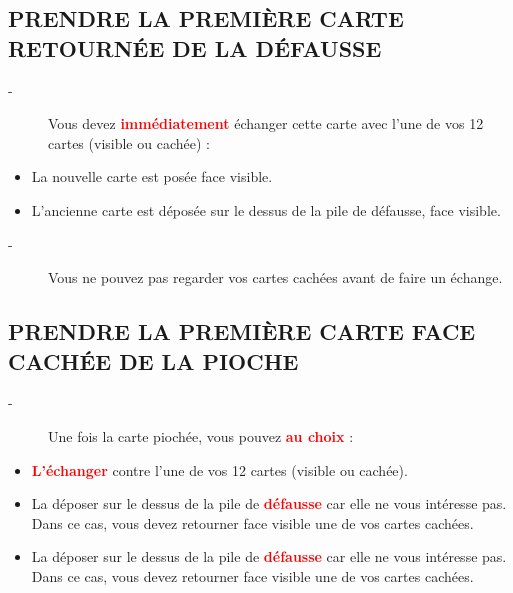 \documentclass{article}%
\begin{document}
%
\subsection{ PRENDRE LA PREMIÈRE CARTE RETOURNÉE DE LA DÉFAUSSE
}%
\label{subsec:PRENDRELAPREMIRECARTERETOURNEDELADFAUSSE}%
\begin{description}%
\item[{-} ]%
%
 Vous devez %
\textcolor{red}{%
\textbf{immédiatement}%
}%
\textit{ }%
 échanger cette carte avec l’une de vos 12 cartes (visible ou cachée) :
%
\end{description}%
\begin{itemize}%
\item%
%
 La nouvelle carte est posée face visible.
%
\item%
%
 L'ancienne carte est déposée sur le dessus de la pile de défausse, face visible.
%
\end{itemize}%
\begin{description}%
\item[{-} ]%
%
 Vous ne pouvez pas regarder vos cartes cachées avant de faire un échange.
%
\end{description}

%
\subsection{ PRENDRE LA PREMIÈRE CARTE FACE CACHÉE DE LA PIOCHE
}%
\label{subsec:PRENDRELAPREMIRECARTEFACECACHEDELAPIOCHE}%
\begin{description}%
\item[{-} ]%
%
Une fois la carte piochée, vous pouvez %
\textcolor{red}{%
\textbf{au choix}%
}%
\textit{ }%
 :
%
\end{description}%
\begin{itemize}%
\item%
%
\textcolor{red}{%
\textbf{L'échanger}%
}%
\textit{ }%
 contre l'une de vos 12 cartes (visible ou cachée).
%
\item%
%
 La déposer sur le dessus de la pile de %
\textcolor{red}{%
\textbf{défausse}%
}%
\textit{ }%
 car elle ne vous intéresse pas. Dans ce cas, vous devez retourner face visible une de vos cartes cachées.
%
\end{itemize}%
\begin{itemize}%
\item%
%
 La déposer sur le dessus de la pile de %
\textcolor{red}{%
\textbf{défausse}%
}%
\textit{ }%
 car elle ne vous intéresse pas. Dans ce cas, vous devez retourner face visible une de vos cartes cachées.
%
\end{itemize}
\end{document}
